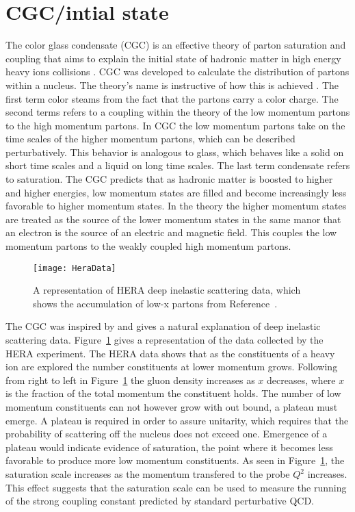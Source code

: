   \section{CGC/intial state \label{sec:cgc}}
    The color glass condensate (CGC) is an effective theory of parton saturation
    	and coupling that aims to explain the initial state of hadronic matter 
    	in high energy heavy ions collisions \cite{CGCandGlasma}. 
    CGC was developed to calculate the distribution of partons within a nucleus. 
    The theory's name is instructive of how this is achieved \cite{CGC2Lec}. 
    The first term color steams from the fact that the partons carry a color 
    	charge.
    The second terms refers to a coupling within the theory of the low momentum 
    	partons to the high momentum partons.
    In CGC the low momentum partons take on the time scales of the higher momentum 
    	partons, which can be described perturbatively. 
    This behavior is analogous to glass, which behaves like a solid on short time 
    	scales and a liquid on long time scales.
    The last term condensate refers to saturation.
    The CGC predicts that as hadronic matter is boosted to higher and higher 
    	energies, low momentum states are filled and become increasingly less 
    	favorable to higher momentum states.
    In the theory the higher momentum states are treated as the source of the lower
    	momentum states in the same manor that an electron is the source of an
    	electric and magnetic field.
    This couples the low momentum partons to the weakly coupled high momentum 
    	partons. 
    
    \begin{figure}[h]
      \centering
        \texttt{[image: HeraData]}
      \caption{A representation of HERA deep inelastic scattering data, which shows
    	the accumulation of low-x partons from Reference~\cite{CGC2Lec}.}
      \label{HeraData}
    \end{figure}
    The CGC was inspired by and gives a natural explanation of deep inelastic
    	scattering data. 
    Figure~\ref{HeraData} gives a representation of the data collected by the HERA 
    	experiment. 
    The HERA data shows that as the constituents of a heavy ion are explored the
    	number constituents at lower momentum grows. 
    Following from right to left in Figure~\ref{HeraData} the gluon density
    	increases as $x$ decreases, where $x$ is the fraction of the total
    	momentum the constituent holds.
    The number of low momentum constituents can not however grow with out bound, a 
    	plateau must emerge.
    A plateau is required in order to assure unitarity, which requires that the
    	probability of scattering off the nucleus does not exceed one. 
    Emergence of a plateau would indicate evidence of saturation, the point where 
    	it becomes less favorable to produce more low momentum constituents. 
    As seen in Figure~\ref{HeraData}, the saturation scale increases as the momentum 
    	transfered to the probe $Q^2$ increases.
    This effect suggests that the saturation scale can be used to measure the 
    	running of the strong coupling constant predicted by standard
    	perturbative QCD.

